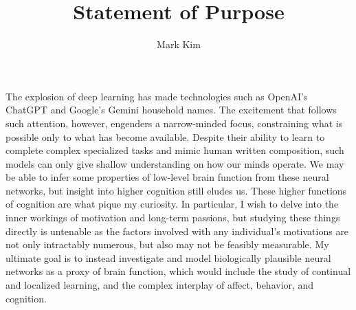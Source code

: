 \documentclass[12pt]{article}
\author{Mark Kim}
\title{Statement of Purpose}
\begin{document}
\maketitle

The explosion of deep learning has made technologies such as OpenAI's ChatGPT and Google's Gemini household names.  The excitement that
follows such attention, however, engenders a narrow-minded focus, constraining what is possible only to what has become available.  Despite
their ability to learn to complete complex specialized tasks and mimic human written composition, such models can only give shallow
understanding on how our minds  operate. We may be able to infer some properties of low-level brain function from these neural networks, but
insight into higher cognition still eludes us.  These higher functions of cognition are what pique my curiosity.  In particular, I wish to
delve into the inner workings of motivation and long-term passions, but studying these things directly is untenable as the factors involved
with any individual's motivations are not only intractably numerous, but also may not be feasibly measurable.  My ultimate goal is to
instead investigate and model biologically plausible neural networks as a proxy of brain function, which would include the study of
continual and localized learning, and the complex interplay of affect, behavior, and cognition.
\end{document}
